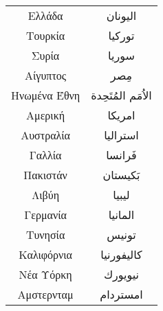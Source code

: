 \documentclass[twocolumn,a4paper]{article}
\newcommand{\ar}[1]{\textarabic{#1}}
\begin{document}
\begin{supertabular}{ c c }
Ελλάδα       & \ar{ اليونان } \\
Τουρκία      & \ar{ توركيا } \\
Συρία        & \ar{ سوريا } \\
Αίγυπτος     & \ar{ مِصر } \\
Ηνωμένα Έθνη & \ar{ اﻻُمَم المُتَحِدة } \\
Αμερική      & \ar{ امريكا } \\
Αυστραλία    & \ar{ استراليا } \\
Γαλλία       & \ar{ فَرانسا } \\
Πακιστάν     & \ar{ بَكيستان } \\
Λιβύη        & \ar{ ليبيا } \\
Γερμανία     & \ar{ المانيا } \\
Τυνησία      & \ar{ تونيس } \\
Καλιφόρνια   & \ar{ كاليفورنيا } \\
Νέα Υόρκη    & \ar{ نيويورك } \\
Αμστερνταμ   & \ar{ امستردام } \\
\end{supertabular}
\end{document}
